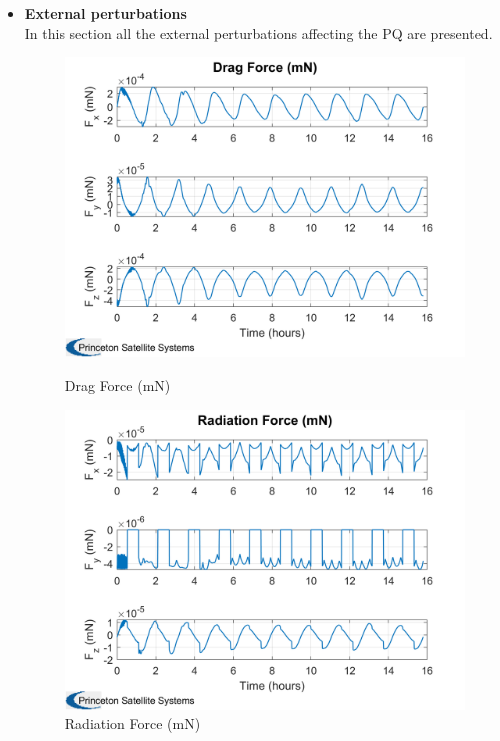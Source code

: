 \begin{itemize}
    \item \textbf{External perturbations}\\
    In this section all the external perturbations affecting the PQ are presented.
    \begin{figure}[H]
        \centering
        \begin{minipage}{0.48\linewidth}
            \centering
            \includegraphics[width=0.95\linewidth]{res/img/Nadir_EKF/Simulations/Drag Force (mN).png}
            \caption{Drag Force (mN)}
        \end{minipage}\hfill
        \begin{minipage}{0.48\linewidth}
            \centering
            \includegraphics[width=0.95\linewidth]{res/img/Nadir_EKF/Simulations/Radiation Force (mN).png}
            \caption{Radiation Force (mN)}
        \end{minipage}
    \end{figure}


\end{itemize}
